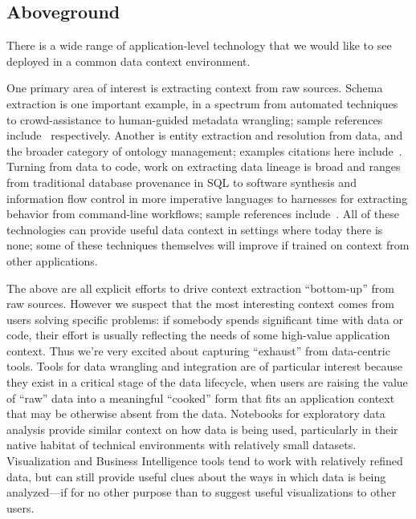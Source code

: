 \documentclass{sig-alternate}
\begin{document}
\subsection{Aboveground}
There is a wide range of application-level technology that we would like to see deployed in a common data context environment. 

One primary area of interest is extracting context from raw sources. Schema extraction is one important example, in a spectrum from automated techniques to crowd-assistance to human-guided metadata wrangling; sample references include~\cite{flashextract,tamr,wrangler} respectively. Another is entity extraction and resolution from data, and the broader category of ontology management; examples citations here include~\cite{daisy,deepdive,ontology}. Turning from data to code, work on extracting data lineage is broad and ranges from traditional database provenance in SQL to software synthesis and information flow control in more imperative languages to harnesses for extracting behavior from command-line workflows; sample references include~\cite{cheney2009provenance,synthesis,ifc,burrito}. All of these technologies can provide useful data context in settings where today there is none; some of these techniques themselves will improve if trained on context from other applications.

The above are all explicit efforts to drive context extraction ``bottom-up'' from raw sources. However we suspect that the most interesting context comes from users solving specific problems: if somebody spends significant time with data or code, their effort is usually reflecting the needs of some high-value application context. Thus we're very excited about capturing ``exhaust'' from data-centric tools. Tools for data wrangling and integration are of particular interest because they exist in a critical stage of the data lifecycle, when users are raising the value of ``raw'' data into a meaningful ``cooked'' form that fits an application context that may be otherwise absent from the data. Notebooks for exploratory data analysis provide similar context on how data is being used, particularly in their native habitat of technical environments with relatively small datasets. Visualization and Business Intelligence tools tend to work with relatively refined data, but can still provide useful clues about the ways in which data is being analyzed---if for no other purpose than to suggest useful visualizations to other users. 
\end{document}
